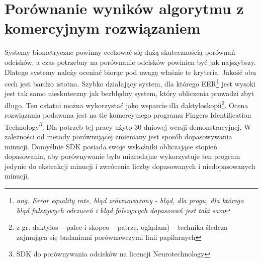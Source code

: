 \chapter{Porównanie wyników algorytmu z komercyjnym rozwiązaniem} 

Systemy biometryczne powinny cechować się dużą skutecznością porównań odcisków, a czas potrzebny na porównanie odcisków powinien być jak najszybszy. Dlatego systemy należy oceniać biorąc pod uwagę właśnie te kryteria. Jakość obu cech jest bardzo istotna. Szybko działający system, dla którego EER\footnote{\em ang. Error equality rate, błąd zrównoważony - błąd, dla progu, dla którego błąd fałszywych odrzuceń i błąd fałszywych dopasowań jest taki sam} jest wysoki jest tak samo nieskuteczny jak bezbłędny system, który obliczenia prowadzi zbyt długo. Ten ostatni można wykorzystać jako wsparcie dla daktyloskopii\footnote{z gr. daktylos – palec i skopeo – patrzę, oglądam) – technika śledcza zajmująca się badaniami porównawczymi linii papilarnych}. Ocena rozwiązania podawana jest na tle komercyjnego programu Fingers Identification Technology\footnote{SDK do porównywania odcisków na licencji Neurotechnology}. Dla potrzeb tej pracy użyto 30 dniowej wersji demonstracyjnej. W zależności od metody porównującej zmieniany jest sposób dopasowywania minucji. Domyślnie SDK posiada swoje wskaźniki obliczające stopień dopasowania, aby porównywanie było miarodajne wykorzystuje ten program jedynie do ekstrakcji minucji i zwrócenia liczby dopasowanych i niedopasowanych minucji. 
